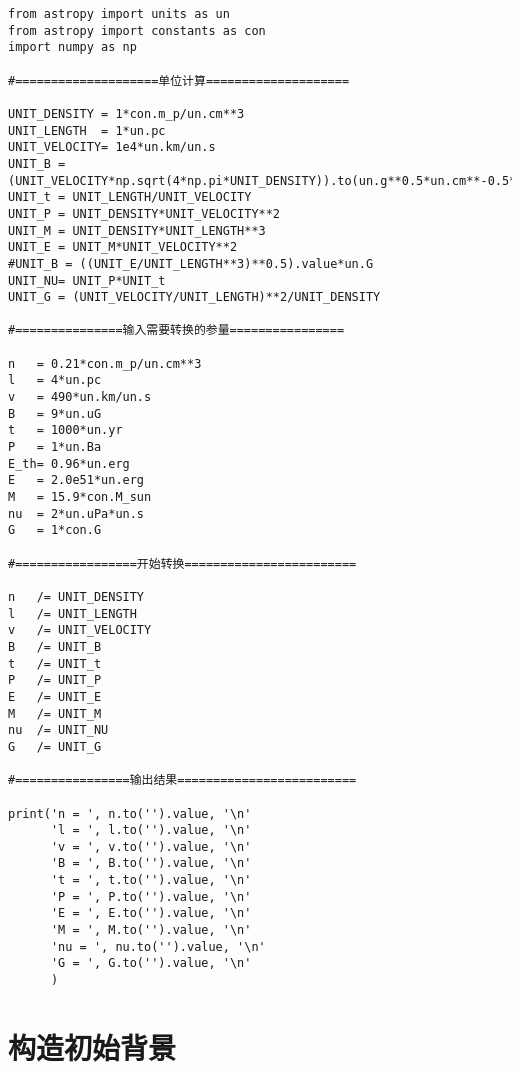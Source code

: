 \begin{lstlisting}
from astropy import units as un
from astropy import constants as con
import numpy as np

#====================单位计算====================

UNIT_DENSITY = 1*con.m_p/un.cm**3
UNIT_LENGTH  = 1*un.pc
UNIT_VELOCITY= 1e4*un.km/un.s
UNIT_B = (UNIT_VELOCITY*np.sqrt(4*np.pi*UNIT_DENSITY)).to(un.g**0.5*un.cm**-0.5*un.s**-1).value*un.G
UNIT_t = UNIT_LENGTH/UNIT_VELOCITY
UNIT_P = UNIT_DENSITY*UNIT_VELOCITY**2
UNIT_M = UNIT_DENSITY*UNIT_LENGTH**3
UNIT_E = UNIT_M*UNIT_VELOCITY**2
#UNIT_B = ((UNIT_E/UNIT_LENGTH**3)**0.5).value*un.G
UNIT_NU= UNIT_P*UNIT_t
UNIT_G = (UNIT_VELOCITY/UNIT_LENGTH)**2/UNIT_DENSITY

#===============输入需要转换的参量================

n   = 0.21*con.m_p/un.cm**3
l   = 4*un.pc
v   = 490*un.km/un.s
B   = 9*un.uG
t   = 1000*un.yr
P   = 1*un.Ba
E_th= 0.96*un.erg
E   = 2.0e51*un.erg
M   = 15.9*con.M_sun
nu  = 2*un.uPa*un.s
G   = 1*con.G

#=================开始转换========================

n   /= UNIT_DENSITY
l   /= UNIT_LENGTH
v   /= UNIT_VELOCITY
B   /= UNIT_B
t   /= UNIT_t
P   /= UNIT_P
E   /= UNIT_E
M   /= UNIT_M
nu  /= UNIT_NU
G   /= UNIT_G

#================输出结果=========================

print('n = ', n.to('').value, '\n'
      'l = ', l.to('').value, '\n'
      'v = ', v.to('').value, '\n'
      'B = ', B.to('').value, '\n'
      't = ', t.to('').value, '\n'
      'P = ', P.to('').value, '\n'
      'E = ', E.to('').value, '\n'
      'M = ', M.to('').value, '\n'
      'nu = ', nu.to('').value, '\n'
      'G = ', G.to('').value, '\n'
      )

\end{lstlisting}


\section{构造初始背景}
\label{Codeb}

